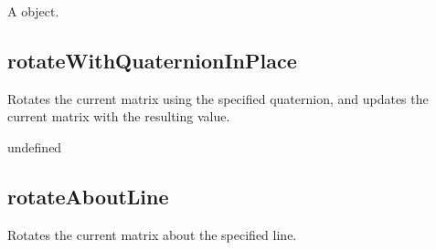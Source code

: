 \documentclass[letterpaper,12pt,english,openany,oneside]{sphinxmanual}
\begin{document}
\label{\detokenize{JS_3D_API:syntax-41}}

\begin{sphinxVerbatim}[commandchars=\\\{\}]
\end{sphinxVerbatim}
\label{\detokenize{JS_3D_API:parameters-28}}

\label{\detokenize{JS_3D_API:section-47}}\label{\detokenize{JS_3D_API:returns-42}}

A  object.


\subsection{rotateWithQuaternionInPlace}
\label{\detokenize{JS_3D_API:rotatewithquaternioninplace}}
Rotates the current matrix using the specified quaternion, and updates the current matrix with the resulting value.

\label{\detokenize{JS_3D_API:syntax-42}}

\begin{sphinxVerbatim}[commandchars=\\\{\}]
\end{sphinxVerbatim}
\label{\detokenize{JS_3D_API:parameters-29}}

\label{\detokenize{JS_3D_API:section-48}}\label{\detokenize{JS_3D_API:returns-43}}

undefined


\subsection{rotateAboutLine}
\label{\detokenize{JS_3D_API:rotateaboutline}}
Rotates the current matrix about the specified line.

\label{\detokenize{JS_3D_API:syntax-43}}

\begin{sphinxVerbatim}[commandchars=\\\{\}]
  
\end{sphinxVerbatim}
\label{\detokenize{JS_3D_API:parameters-30}}
\end{document}
